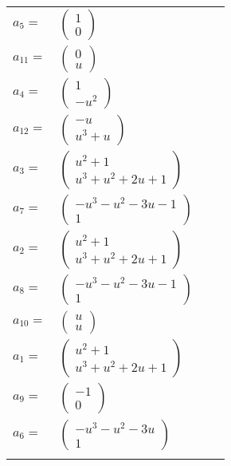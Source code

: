 \documentclass[1p]{elsarticle_modified}
\theoremstyle{definition}
\begin{document}
\begin{tabular}{m{7pt} m{180pt} m{7pt} m{180pt} }
\flushright $a_{5}=$&$\begin{pmatrix}1\\0\end{pmatrix}$ \\
\flushright $a_{11}=$&$\begin{pmatrix}0\\u\end{pmatrix}$ \\
\flushright $a_{4}=$&$\begin{pmatrix}1\\- u^2\end{pmatrix}$ \\
\flushright $a_{12}=$&$\begin{pmatrix}- u\\u^3+u\end{pmatrix}$ \\
\flushright $a_{3}=$&$\begin{pmatrix}u^2+1\\u^3+u^2+2 u+1\end{pmatrix}$ \\
\flushright $a_{7}=$&$\begin{pmatrix}- u^3- u^2-3 u-1\\1\end{pmatrix}$ \\
\flushright $a_{2}=$&$\begin{pmatrix}u^2+1\\u^3+u^2+2 u+1\end{pmatrix}$ \\
\flushright $a_{8}=$&$\begin{pmatrix}- u^3- u^2-3 u-1\\1\end{pmatrix}$ \\
\flushright $a_{10}=$&$\begin{pmatrix}u\\u\end{pmatrix}$ \\
\flushright $a_{1}=$&$\begin{pmatrix}u^2+1\\u^3+u^2+2 u+1\end{pmatrix}$ \\
\flushright $a_{9}=$&$\begin{pmatrix}-1\\0\end{pmatrix}$ \\
\flushright $a_{6}=$&$\begin{pmatrix}- u^3- u^2-3 u\\1\end{pmatrix}$\\&\end{tabular}
\end{document}
